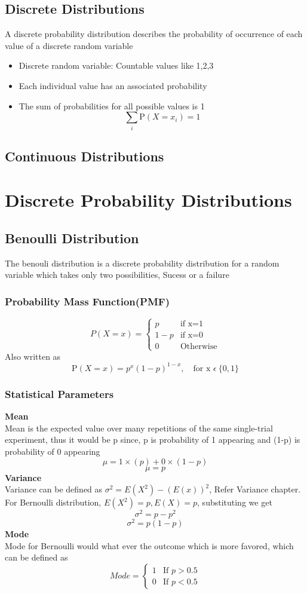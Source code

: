 \documentclass[12pt]{extarticle}
\begin{document}
\subsection{Discrete Distributions}
A discrete probability distribution describes the probability of occurrence of each value of a discrete random variable
\begin{itemize}
    \item Discrete random variable: Countable values like 1,2,3
    \item Each individual value has an associated probability 
    \item The sum of probabilities for all possible values is 1
    $$ \sum_i \mathrm{P}(X=x_i)=1$$
\end{itemize}

\subsection{Continuous Distributions}

\section{Discrete Probability Distributions}
\subsection{Benoulli Distribution}
The benouli distribution is a discrete probability distribution for a random variable which takes only two possibilities, Sucess or a failure 
\subsubsection{Probability Mass Function(PMF)}
$$
P(X=x) = 
\begin{cases}
    p & \text{if x=1} \\
    1-p & \text{if x=0} \\
    0 & \text{Otherwise}
\end{cases}
$$
Also written as 
$$ \mathrm{P}(X=x) = p^x(1-p)^{1-x}, \quad \text{for x }\epsilon \ \{0,1\}$$

\subsubsection{Statistical Parameters}
\textbf{Mean}\\
Mean is the expected value over many repetitions of the same single-trial experiment,
thus it would be p since, p is probability of 1 appearing and (1-p) is probability of 0 appearing
$$\mu = 1 \times (p)+0 \times (1-p)$$
$$\mu = p$$
\textbf{Variance}\\
Variance can be defined as \( \sigma^2 = E(X^2) - (E(x))^2\), Refer Variance chapter. 
For Bernoulli distribution, \(E(X^2) = p, E(X) = p\), substituting we get
$$\sigma^2 = p - p^2$$
$$\sigma^2 = p(1-p)$$
\textbf{Mode}\\
Mode for Bernoulli would what ever the outcome which is more favored, which can be defined as  
$$
Mode = 
\begin{cases}
    1 & \text{If \(p > 0.5 \)}  \\
    0 & \text{If \(p < 0.5\)}
\end{cases}
$$
\end{document}
